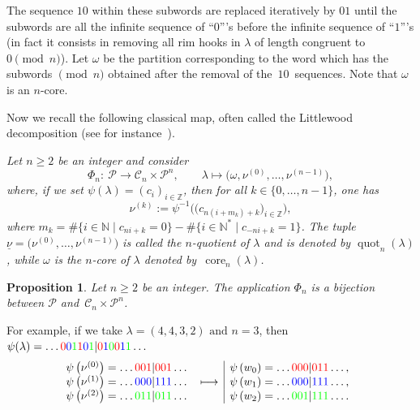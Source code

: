 \documentclass[pdftex]{sigma}
\newtheorem{Proposition}[Theorem]{Proposition}
 { \theoremstyle{definition}
\newtheorem{Definition}[Theorem]{Definition}
\newtheorem{Note}[Theorem]{Note}
\newtheorem{Example}[Theorem]{Example}
\newtheorem{Remark}[Theorem]{Remark} }
\numberwithin{equation}{section}
\def\ccp{\mathcal P}
\DeclareMathOperator{\core}{core}
\DeclareMathOperator{\quot}{quot}
\newcommand{\Z}{\mathbb{Z}}
\newcommand{\N}{\mathbb{N}}
\begin{document}
The sequence $10$ within these subwords are replaced iteratively by $01$ until the subwords are all the infinite sequence of ``$0$'''s before the infinite sequence of ``$1$'''s (in fact it consists in removing all rim hooks in $\lambda$ of length congruent to $0\pmod n$). Let $\omega$ be the partition corresponding to the word which has the subwords $\pmod n$ obtained after the removal of the~$10$~sequences. Note that $\omega$ is an $n$-core.


Now we recall the following classical map, often called the Littlewood decomposition (see for instance~\cite{GKS,HJ}).

\begin{Definition}\label{def:Phi}{\em
 Let $n \geq 2$ be an integer and consider
\[
\Phi_n\colon \  \mathcal{P}   \to   \mathcal{C}_{n} \times \mathcal{P}^n, \qquad
  \lambda   \mapsto   \bigl(\omega,\nu^{(0)},\dots,\nu^{(n-1)}\bigr),
\]
where, if we set $\psi(\lambda)=(c_i)_{i\in\Z}$, then for all $k\in\lbrace 0,\dots,n-1\rbrace$, one has
\[
\nu^{(k)}:=\psi^{-1}\bigl(\bigl(c_{n(i+m_k)+k}\bigr)_{i\in\Z}\bigr),
\]
 where $m_k=\#\lbrace i\in\N \mid c_{ni+k}=0\rbrace-\#\lbrace i\in\N^* \mid c_{-ni+k}=1\rbrace$.
 The tuple $\underline{\nu}=\bigl(\nu^{(0)},\dots,\nu^{(n-1)}\bigr)$ is called the $n$-quotient of $\lambda$ and is denoted by \textit{$\quot_n(\lambda)$}, while $\omega$ is the $n$-core of $\lambda$ denoted by~\textit{$\core_n(\lambda)$}.}
\end{Definition}
\begin{Proposition}
Let $n \geq 2$ be an integer. The application $\Phi_n$ is a bijection between $\ccp$ and~${\mathcal{C}_{n} \times \mathcal{P}^n}$.
\end{Proposition}
For example, if we take $\lambda = (4,4,3,2) \text{ and } n=3$, then $\psi(\lambda)=\dots \color{red}{0} \color{blue}{0} \color{green}{1} \color{red}{1} \color{blue}{0}\color{green}{1} \color{black}| \color{red}{0} \color{blue}{1} \color{green}{0} \color{red}{0} \color{blue}{1} \color{green}{1}\color{black}\dots$
\begin{align*}%
\begin{array}{@{}rc|rcl}
\psi\left(\nu^{(0)}\right)=\dots \color{red} 001 \color{black}| \color{red}001\color{black}\dots& &\psi\left(w_{0}\right)=\dots \color{red} 000 \color{black}| \color{red}011\color{black}\dots,\\
 \psi\left(\nu^{(1)}\right)=\dots \color{blue} 000 \color{black}| \color{blue}111\color{black}\dots& \longmapsto& \psi\left(w_{1}\right)=\dots \color{blue} 000 \color{black}| \color{blue}111\color{black}\dots , \\
 \psi\left(\nu^{(2)}\right)=\dots \color{green} 011 \color{black}| \color{green}011\color{black}\dots & & \psi\left(w_{2}\right)=\dots \color{green} 001 \color{black}| \color{green}111\color{black}\dots .
\end{array}
\end{align*}
\end{document}
